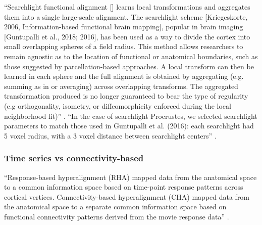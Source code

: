 ``Searchlight functional alignment [\citep{zhang2016searchlight,
guntupalli2016model}] learns local transformations and aggregates them into a
single large-scale alignment.
%
The searchlight scheme [Kriegeskorte, 2006, Information-based functional brain
mapping], popular in brain imaging [Guntupalli et al., 2018; 2016], has been
used as a way to divide the cortex into small overlapping spheres of a field
radius.
%
This method allows researchers to remain agnostic as to the location of
functional or anatomical boundaries, such as those suggested by
parcellation-based approaches.
%
A local transform can then be learned in each sphere and the full alignment is
obtained by aggregating (e.g. summing as in \citep{guntupalli2016model} or
averaging) across overlapping transforms.
%
The aggregated transformation produced is no longer guaranteed to bear the type
of regularity (e.g orthogonality, isometry, or diffeomorphicity enforced during
the local neighborhood fit)'' \citep{bazeille2021empirical}.
%
``In the case of searchlight Procrustes, we selected searchlight parameters to
match those used in Guntupalli et al. (2016):
%
each searchlight had 5 voxel radius, with a 3 voxel distance between searchlight
centers'' \citep{bazeille2021empirical}.


\subsubsection{Time series vs connectivity-based}






%
``Response-based hyperalignment (RHA) mapped data from the anatomical space to a
common information space based on time-point response patterns across cortical
vertices.
%
Connectivity-based hyperalignment (CHA) mapped data from the
anatomical space to a separate common information space based on functional
connectivity patterns derived from the movie response data''
\citep{busch2021hybrid}.

